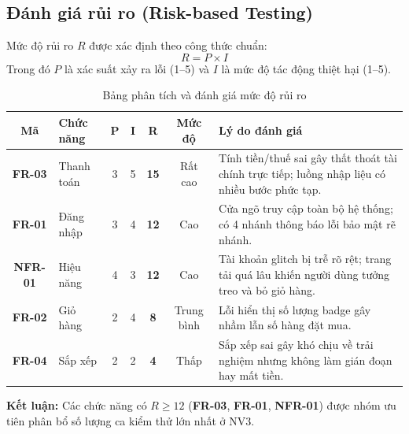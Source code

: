 \documentclass[a4paper]{article}
\begin{document}
\clearpage
\subsection{Đánh giá rủi ro (Risk-based Testing)}
Mức độ rủi ro $R$ được xác định theo công thức chuẩn:
\begin{equation}
  R = P \times I
\end{equation}
Trong đó $P$ là xác suất xảy ra lỗi (1--5) và $I$ là mức độ tác động thiệt hại (1--5).
\begin{table}[H]
\centering
\small
\begin{tabularx}{\textwidth}{|c|l|c|c|c|c|X|}
\hline
\textbf{Mã} & \textbf{Chức năng} & \textbf{P} & \textbf{I} & \textbf{R} & \textbf{Mức độ} & \textbf{Lý do đánh giá} \\ \hline
\textbf{FR-03} & Thanh toán & 3 & 5 & \textbf{15} & Rất cao & Tính tiền/thuế sai gây thất thoát tài chính trực tiếp; luồng nhập liệu có nhiều bước phức tạp. \\ \hline
\textbf{FR-01} & Đăng nhập & 3 & 4 & \textbf{12} & Cao & Cửa ngõ truy cập toàn bộ hệ thống; có 4 nhánh thông báo lỗi bảo mật rẽ nhánh. \\ \hline
\textbf{NFR-01} & Hiệu năng & 4 & 3 & \textbf{12} & Cao & Tài khoản glitch bị trễ rõ rệt; trang tải quá lâu khiến người dùng tưởng treo và bỏ giỏ hàng. \\ \hline
\textbf{FR-02} & Giỏ hàng & 2 & 4 & \textbf{8} & Trung bình & Lỗi hiển thị số lượng badge gây nhầm lẫn số hàng đặt mua. \\ \hline
\textbf{FR-04} & Sắp xếp & 2 & 2 & \textbf{4} & Thấp & Sắp xếp sai gây khó chịu về trải nghiệm nhưng không làm gián đoạn hay mất tiền. \\ \hline
\end{tabularx}
\caption{Bảng phân tích và đánh giá mức độ rủi ro}
\end{table}

\noindent \textbf{Kết luận:} Các chức năng có $R \ge 12$ (\textbf{FR-03}, \textbf{FR-01}, \textbf{NFR-01}) được nhóm ưu tiên phân bổ số lượng ca kiểm thử lớn nhất ở NV3.
\end{document}
